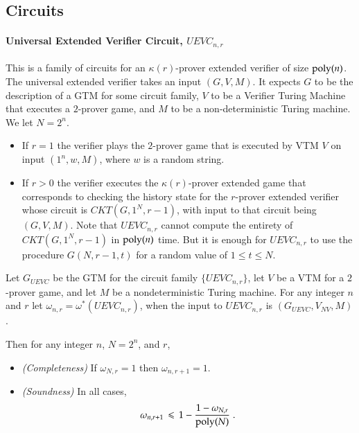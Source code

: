 \documentclass[11pt,letterpaper]{article}
\begin{document}
\subsection{Circuits}
\label{sec:circuits}

\paragraph{Universal Extended Verifier Circuit, $UEVC_{n,r}$} This is a family of circuits for an $\kappa(r)$-prover extended verifier of size $\operatorname{poly}(n)$. The universal extended verifier takes an input $(G,V,M)$. It expects $G$ to be the description of a GTM for some circuit family, $V$ to be a Verifier Turing Machine that executes a $2$-prover game, and $M$ to be a non-deterministic Turing machine. %
We let $N = 2^n$.
\begin{itemize}
\item If $r=1$ the verifier plays the $2$-prover game that is executed by VTM $V$ on input $(1^n,w,M)$, where $w$ is a random string.

\item If $r>0$ the verifier executes the $\kappa(r)$-prover extended game that corresponds to checking the history state for the $r$-prover extended verifier whose circuit is $CKT(G,1^N,r-1)$, with input to that circuit being $(G,V,M)$. Note that $UEVC_{n,r}$ cannot compute the entirety of $CKT(G,1^N,r-1)$ in $\operatorname{poly}(n)$ time. But it is enough for $UEVC_{n,r}$ to use the procedure $G(N,r-1,t)$ for a random value of $1\leq t\leq N$.
\end{itemize}

\begin{proposition}
\label{prop:uevc_soundness}

	Let $G_{UEVC}$ be the GTM for the circuit family $\{UEVC_{n,r}\}$, let $V$ be a VTM for a $2$-prover game, and let $M$ be a nondeterministic Turing machine. For any integer $n$ and $r$ let $\omega_{n,r} = \omega^*(UEVC_{n,r})$, when the input to $UEVC_{n,r}$ is $(G_{UEVC},V_{NV},M)$. 
	
	Then for any integer $n$, $N=2^n$, and $r$,
	\begin{itemize}
	\item \emph{(Completeness)} If $\omega_{N,r}=1$ then $\omega_{n,r+1}=1$.
	\item \emph{(Soundness)} In all cases,
	\[
		\omega_{n,r+1} \,\leqslant\, 1 - \frac{1 - \omega_{N,r}}{\operatorname{poly}(N)}\;.
	\]
	\end{itemize}
\end{proposition}
\end{document}
